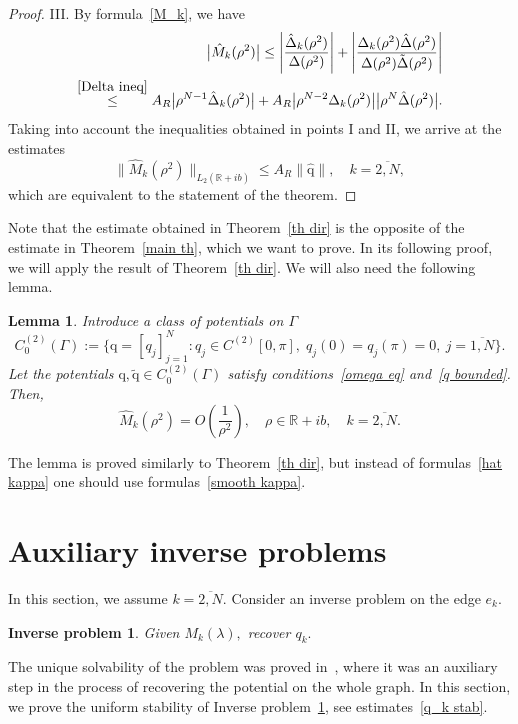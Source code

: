 \documentclass[a4paper, 12pt] {article}
\theoremstyle{plain}
\newtheorem{lemma}{\indent Lemma}
\newtheorem{IP}{\indent Inverse problem}
\theoremstyle{remark}
\theoremstyle{plain}
\theoremstyle{definition}
\numberwithin{equation}{section}
\begin{document}
\begin{proof}
III.  By formula~\eqref{M_k}, we have
\begin{equation*}
\begin{split}
\big|\hat M_k(\rho^2)\big| \le \left| \frac{\hat \Delta_k(\rho^2)}{\Delta(\rho^2)}\right| +\left| \frac{\Delta_k(\rho^2)\hat \Delta(\rho^2)}{\Delta(\rho^2)\tilde\Delta(\rho^2)}\right| \\
\overset{\eqref{Delta ineq}}{\le} A_R \big|\rho^{N-1}\hat\Delta_k(\rho^2)\big|
+A_R \big|\rho^{N-2}\Delta_k(\rho^2)\big|\big|\rho^{N}\hat\Delta(\rho^2)\big|.
\end{split}
\end{equation*}
Taking into account the inequalities obtained in points I and II, we arrive at the estimates
$$\big\|\hat M_k(\rho^2)\big\|_{L_2({\mathbb R}+ ib)} \le A_R \|\hat{\mathrm q}\|, \quad k=\overline{2, N}, $$
which are equivalent to the statement of the theorem.
 \end{proof}
  Note that the estimate obtained in Theorem~\ref{th dir} is the opposite of the estimate in Theorem~\ref{main th}, which we want to prove. In its following proof, we will apply the result of Theorem~\ref{th dir}.
We will also need the following lemma.
\begin{lemma} \label{G_delta}
Introduce a class of potentials on $\Gamma$
\begin{equation*}
C^{(2)}_0(\Gamma) := \Big\{ {\mathrm q} = [q_j]_{j=1}^N \colon q_j \in C^{(2)}[0, \pi], \; q_j(0) = q_j(\pi) =0,\ j=\overline{1, N}\Big\}.
\end{equation*}
Let the potentials $\mathrm q, \tilde{\mathrm q} \in C^{(2)}_0(\Gamma)$ satisfy conditions~\eqref{omega eq} and~\eqref{q bounded}.
Then,
$$\hat M_k(\rho^2) = O\left(\frac{1}{\rho^2}\right), \quad \rho \in {\mathbb R}+i b,
\quad k=\overline{2, N}.$$
\end{lemma}
The lemma is proved similarly to Theorem~\ref{th dir}, but instead of formulas~\eqref{hat kappa} one should use formulas~\eqref{smooth kappa}.

\section{Auxiliary inverse problems}
\label{IP(k)}

In this section, we assume $k = \overline{2, N}.$ Consider an inverse problem on the edge $e_k.$
\begin{IP} \label{aux}
Given $M_k(\lambda),$ recover $q_k.$
\end{IP}
The unique solvability of the problem was proved in~\cite{yurko2005}, where it was an auxiliary step in the process of recovering the potential on the whole graph. 
In this section, we prove the uniform stability of Inverse problem~\ref{aux}, see estimates~\eqref{q_k stab}.
\end{document}

